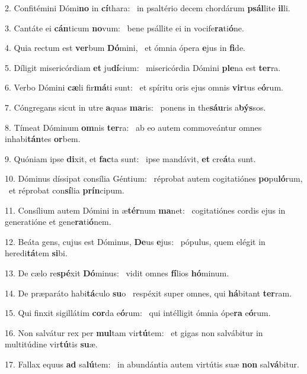 2. Confitémini Dómi\textbf{no} in \textbf{cí}thara: \ast\  in psaltério decem chordárum \textbf{psál}lite \textbf{il}li.\

3. Cantáte ei \textbf{cán}ticum \textbf{no}vum: \ast\  bene psállite ei in vocife\textbf{ra}ti\textbf{ó}ne.\

4. Quia rectum est \textbf{ver}bum \textbf{Dó}mini, \ast\  et ómnia ópera \textbf{e}jus in \textbf{fi}de.\

5. Díligit misericórdiam \textbf{et} ju\textbf{dí}cium: \ast\  misericórdia Dómini \textbf{ple}na est \textbf{ter}ra.\

6. Verbo Dómini \textbf{cæ}li fir\textbf{má}ti sunt: \ast\  et spíritu oris ejus omnis \textbf{vir}tus e\textbf{ó}rum.\

7. Cóngregans sicut in utre \textbf{a}quas \textbf{ma}ris: \ast\  ponens in the\textbf{sáu}ris a\textbf{býs}sos.\

8. Tímeat Dóminum \textbf{om}nis \textbf{ter}ra: \ast\  ab eo autem commoveántur omnes inhabi\textbf{tán}tes \textbf{or}bem.\

9. Quóniam ipse \textbf{di}xit, et \textbf{fac}ta sunt: \ast\  ipse mandávit, \textbf{et} cre\textbf{á}ta sunt.\

10. Dóminus díssipat consília Géntium: \dag\  réprobat autem cogitatiónes \textbf{po}pu\textbf{ló}rum, \ast\  et réprobat con\textbf{sí}lia \textbf{prín}cipum.\

11. Consílium autem Dómini in æ\textbf{tér}num \textbf{ma}net: \ast\  cogitatiónes cordis ejus in generatióne et gene\textbf{ra}ti\textbf{ó}nem.\

12. Beáta gens, cujus est Dóminus, \textbf{De}us \textbf{e}jus: \ast\  pópulus, quem elégit in heredi\textbf{tá}tem \textbf{si}bi.\

13. De cælo re\textbf{spé}xit \textbf{Dó}minus: \ast\  vidit omnes \textbf{fí}lios \textbf{hó}minum.\

14. De præparáto habi\textbf{tá}culo \textbf{su}o \ast\  respéxit super omnes, qui \textbf{há}bitant \textbf{ter}ram.\

15. Qui finxit sigillátim \textbf{cor}da e\textbf{ó}rum: \ast\  qui intélligit ómnia ópe\textbf{ra} e\textbf{ó}rum.\

16. Non salvátur rex per \textbf{mul}tam vir\textbf{tú}tem: \ast\  et gigas non salvábitur in multitúdine vir\textbf{tú}tis \textbf{su}æ.\

17. Fallax equus \textbf{ad} sa\textbf{lú}tem: \ast\  in abundántia autem virtútis suæ \textbf{non} sal\textbf{vá}bitur.\

